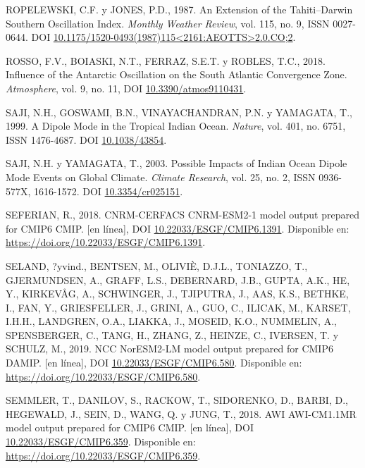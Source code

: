 \documentclass[12pt,oneside,a4paper]{reedthesis}
\newlength{\cslhangindent}
\newenvironment{CSLReferences}[2] %
 {%
  \setlength{\parindent}{0pt}
  \ifodd #1 \everypar{\setlength{\hangindent}{\cslhangindent}}\ignorespaces\fi
  \ifnum #2 > 0
  \setlength{\parskip}{#2\baselineskip}
  \fi
 }%
 {}
\begin{document}
\begin{CSLReferences}{1}{0}
\leavevmode{}%
ROPELEWSKI, C.F. y JONES, P.D., 1987. An {Extension} of the {Tahiti}--{Darwin Southern Oscillation Index}. \emph{Monthly Weather Review}, vol. 115, no. 9, ISSN 0027-0644. DOI \href{https://doi.org/10.1175/1520-0493(1987)115\%3C2161:AEOTTS\%3E2.0.CO;2}{10.1175/1520-0493(1987)115\textless2161:AEOTTS\textgreater2.0.CO;2}.

\leavevmode{}%
ROSSO, F.V., BOIASKI, N.T., FERRAZ, S.E.T. y ROBLES, T.C., 2018. Influence of the {Antarctic Oscillation} on the {South Atlantic Convergence Zone}. \emph{Atmosphere}, vol. 9, no. 11, DOI \href{https://doi.org/10.3390/atmos9110431}{10.3390/atmos9110431}.

\leavevmode{}%
SAJI, N.H., GOSWAMI, B.N., VINAYACHANDRAN, P.N. y YAMAGATA, T., 1999. A Dipole Mode in the Tropical {Indian Ocean}. \emph{Nature}, vol. 401, no. 6751, ISSN 1476-4687. DOI \href{https://doi.org/10.1038/43854}{10.1038/43854}.

\leavevmode{}%
SAJI, N.H. y YAMAGATA, T., 2003. Possible Impacts of {Indian Ocean Dipole} Mode Events on Global Climate. \emph{Climate Research}, vol. 25, no. 2, ISSN 0936-577X, 1616-1572. DOI \href{https://doi.org/10.3354/cr025151}{10.3354/cr025151}.

\leavevmode{}%
SEFERIAN, R., 2018. CNRM-CERFACS CNRM-ESM2-1 model output prepared for CMIP6 CMIP. {[}en línea{]}, DOI \href{https://doi.org/10.22033/ESGF/CMIP6.1391}{10.22033/ESGF/CMIP6.1391}. Disponible en: \url{https://doi.org/10.22033/ESGF/CMIP6.1391}.

\leavevmode{}%
SELAND, ?yvind., BENTSEN, M., OLIVIÈ, D.J.L., TONIAZZO, T., GJERMUNDSEN, A., GRAFF, L.S., DEBERNARD, J.B., GUPTA, A.K., HE, Y., KIRKEVÅG, A., SCHWINGER, J., TJIPUTRA, J., AAS, K.S., BETHKE, I., FAN, Y., GRIESFELLER, J., GRINI, A., GUO, C., ILICAK, M., KARSET, I.H.H., LANDGREN, O.A., LIAKKA, J., MOSEID, K.O., NUMMELIN, A., SPENSBERGER, C., TANG, H., ZHANG, Z., HEINZE, C., IVERSEN, T. y SCHULZ, M., 2019. NCC NorESM2-LM model output prepared for CMIP6 DAMIP. {[}en línea{]}, DOI \href{https://doi.org/10.22033/ESGF/CMIP6.580}{10.22033/ESGF/CMIP6.580}. Disponible en: \url{https://doi.org/10.22033/ESGF/CMIP6.580}.

\leavevmode{}%
SEMMLER, T., DANILOV, S., RACKOW, T., SIDORENKO, D., BARBI, D., HEGEWALD, J., SEIN, D., WANG, Q. y JUNG, T., 2018. AWI AWI-CM1.1MR model output prepared for CMIP6 CMIP. {[}en línea{]}, DOI \href{https://doi.org/10.22033/ESGF/CMIP6.359}{10.22033/ESGF/CMIP6.359}. Disponible en: \url{https://doi.org/10.22033/ESGF/CMIP6.359}.


\end{CSLReferences}
\end{document}
